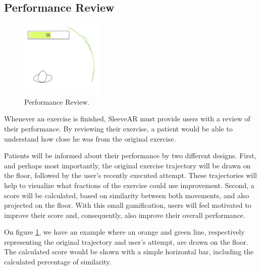 \subsection{Performance Review}

\begin{figure}
    \begin{center}
        \includegraphics[width=0.35\textwidth]{imgs/approach/performancereview.png}
    \end{center}
    \caption{Performance Review.}
    \label{fig:performancereview}
\end{figure}

Whenever an exercise is finished, SleeveAR must provide users with a review of their performance. 
By reviewing their exercise, a patient would be able to understand how close he was from the original exercise.

Patients will be informed about their performance by two different designs. 
First, and perhaps most importantly, the original exercise trajectory will be drawn on the floor, followed by the user's recently executed attempt. 
These trajectories will help to visualize what fractions of the exercise could use improvement.
Second, a score will be calculated, based on similarity between both movements, and also projected on the floor. 
With this small gamification, users will feel motivated to improve their score and, consequently, also improve their overall performance.

On figure \ref{fig:performancereview}, we have an example where an orange and green line, 
respectively representing the original trajectory and user's attempt, are drawn on the floor. 
The calculated score would be shown with a simple horizontal bar, including the calculated percentage of similarity.